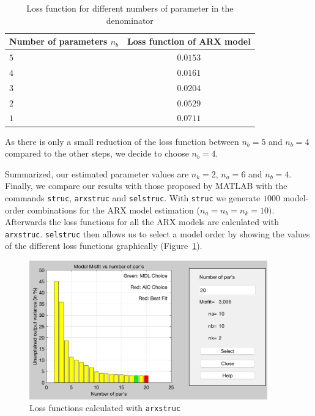 \documentclass{scrartcl}
\begin{document}
\begin{table}[h]
	\centering
	\begin{tabular}{l|c}
	\hline
	\hline
	\textbf{Number of parameters $n_b$} & \textbf{Loss function of ARX model}\\
	\hline
		$5$ & $0.0153$ \\ \hline
		$4$ & $0.0161$ \\ \hline
		$3$ & $0.0204$ \\ \hline
		$2$ & $0.0529$ \\ \hline
		$1$ & $0.0711$ \\ \hline
	\hline
	\end{tabular}
	\caption{Loss function for different numbers of parameter in the denominator}
	\label{tab:denom}
\end{table}

As there is only a small reduction of the loss function between $n_b = 5$ and $n_b = 4$ compared to the other steps, we decide to choose $n_b = 4$. 

Summarized, our estimated parameter values are $n_k = 2$, $n_a = 6$ and  $n_b = 4$. \\

Finally, we compare our results with those proposed by MATLAB with the commands \texttt{struc}, \texttt{arxstruc} and \texttt{selstruc}. 
With \texttt{struc} we generate $1000$ model-order combinations for the ARX model estimation ($n_a = n_b = n_k = 10)$. Afterwards the loss functions for all the ARX models are calculated with \texttt{arxstruc}. \texttt{selstruc} then allows us to select a model order by showing the values of the different loss functions graphically (Figure~\ref{fig:selstruc}). 

\begin{figure}[h]
	\centering
	\includegraphics[height=6cm]{figures/selstruc.png}
	\caption{Loss functions calculated with \texttt{arxstruc}}\label{fig:selstruc}
\end{figure}
\end{document}
